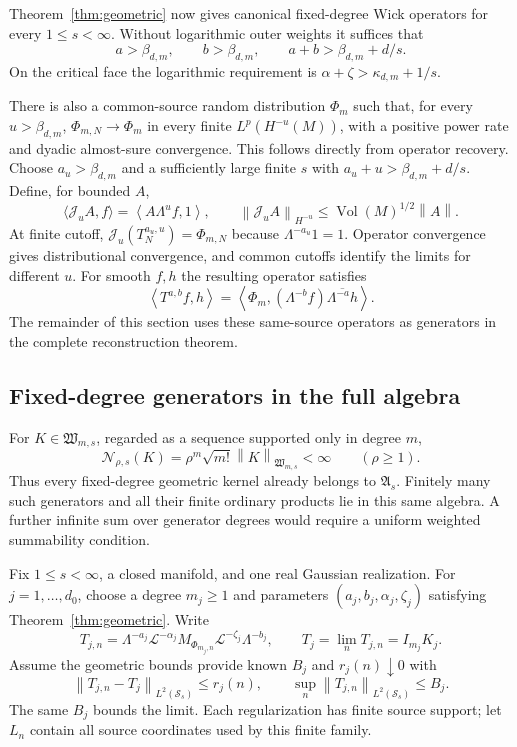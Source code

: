 \documentclass[11pt,a4paper]{amsart}
\numberwithin{equation}{section}
\theoremstyle{definition}
\theoremstyle{remark}
\newcommand{\Sch}{\mathcal S}
\newcommand{\Wc}{\mathfrak W}
\newcommand{\Alg}{\mathfrak A}
\newcommand{\norm}[1]{\left\lVert#1\right\rVert}
\newcommand{\ip}[2]{\left\langle#1,#2\right\rangle}
\newcommand{\Nn}[2]{\mathcal N_{#1,s}(#2)}
\begin{document}
Theorem~\ref{thm:geometric} now gives canonical fixed-degree Wick operators for every $1\le s<\infty$. Without logarithmic outer weights it suffices that
\begin{equation}\label{eq:gffcondition}
 a>\beta_{d,m},\qquad b>\beta_{d,m},\qquad a+b>\beta_{d,m}+d/s.
\end{equation}
On the critical face the logarithmic requirement is
$\alpha+\zeta>\kappa_{d,m}+1/s$.

There is also a common-source random distribution $\Phi_m$ such that, for every $u>\beta_{d,m}$, $\Phi_{m,N}\to\Phi_m$ in every finite $L^p(H^{-u}(M))$, with a positive power rate and dyadic almost-sure convergence. This follows directly from operator recovery. Choose $a_u>\beta_{d,m}$ and a sufficiently large finite $s$ with $a_u+u>\beta_{d,m}+d/s$. Define, for bounded $A$,
\[
 \langle\mathcal J_uA,f\rangle=\ip{A\Lambda^uf}{1},\qquad
 \norm{\mathcal J_uA}_{H^{-u}}\le\operatorname{Vol}(M)^{1/2}\norm A.
\]
At finite cutoff, $\mathcal J_u(T_N^{a_u,u})=\Phi_{m,N}$ because $\Lambda^{-a_u}1=1$. Operator convergence gives distributional convergence, and common cutoffs identify the limits for different $u$. For smooth $f,h$ the resulting operator satisfies
\begin{equation}\label{eq:distributionpair}
 \ip{T^{a,b}f}{h}
 =\left\langle\Phi_m,(\Lambda^{-b}f)\overline{\Lambda^{-a}h}\right\rangle.
\end{equation}
The remainder of this section uses these same-source operators as generators in the complete reconstruction theorem.

\subsection{Fixed-degree generators in the full algebra}
For $K\in\Wc_{m,s}$, regarded as a sequence supported only in degree $m$,
\begin{equation}\label{eq:fixeddegree_allradii}
 \Nn\rho K=\rho^m\sqrt{m!}\norm K_{\Wc_{m,s}}<\infty
 \qquad(\rho\ge1).
\end{equation}
Thus every fixed-degree geometric kernel already belongs to $\Alg_s$. Finitely many such generators and all their finite ordinary products lie in this same algebra. A further infinite sum over generator degrees would require a uniform weighted summability condition.

Fix $1\le s<\infty$, a closed manifold, and one real Gaussian realization. For $j=1,\ldots,d_0$, choose a degree $m_j\ge1$ and parameters $(a_j,b_j,\alpha_j,\zeta_j)$ satisfying Theorem~\ref{thm:geometric}. Write
\begin{equation}\label{eq:wick_family}
 T_{j,n}=\Lambda^{-a_j}\mathscr L^{-\alpha_j}
 M_{\Phi_{m_j,n}}\mathscr L^{-\zeta_j}\Lambda^{-b_j},
 \qquad T_j=\lim_nT_{j,n}=I_{m_j}K_j.
\end{equation}
Assume the geometric bounds provide known $B_j$ and $r_j(n)\downarrow0$ with
\[
 \norm{T_{j,n}-T_j}_{L^2(\Sch_s)}\le r_j(n),\qquad
 \sup_n\norm{T_{j,n}}_{L^2(\Sch_s)}\le B_j.
\]
The same $B_j$ bounds the limit. Each regularization has finite source support; let $L_n$ contain all source coordinates used by this finite family.
\end{document}
